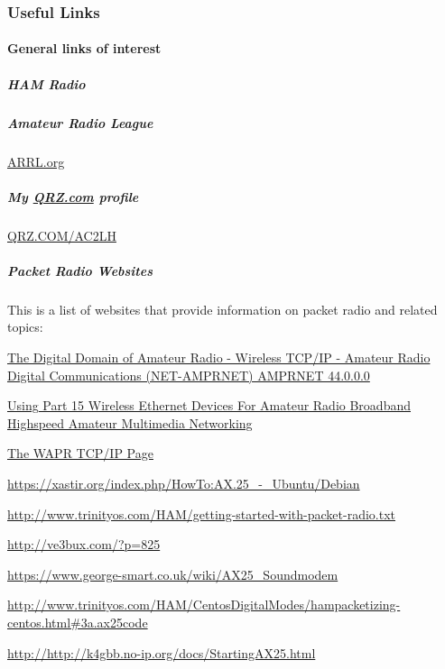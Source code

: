 \subsubsection{Useful Links}

\paragraph{General links of interest}

\subparagraph{HAM Radio}

\subparagraph{Amateur Radio League}

\href{http://www.arrl.org}{ARRL.org}

\subparagraph{My \href{http://QRZ.com}{QRZ.com} profile}

\href{http://www.qrz.com/db/AC2LH}{QRZ.COM/AC2LH}

\subparagraph{Packet Radio Websites}

This is a list of websites that provide information on packet radio and related topics:

\href{https://www.qsl.net/kb9mwr/wapr/tcpip/amprnet.html}{The Digital Domain of Amateur Radio - Wireless TCP/IP - Amateur Radio Digital Communications (NET-AMPRNET) AMPRNET 44.0.0.0}

\href{https://www.qsl.net/kb9mwr/projects/wireless/plan.html}{Using Part 15 Wireless Ethernet Devices For Amateur Radio Broadband Highspeed Amateur Multimedia Networking}

\href{https://www.qsl.net/kb9mwr/wapr/tcpip/}{The WAPR TCP/IP Page}

\href{https://xastir.org/index.php/HowTo:AX.25\_-\_Ubuntu/Debian}{https://xastir.org/index.php/HowTo:AX.25\_-\_Ubuntu/Debian}

\href{http://www.trinityos.com/HAM/getting-started-with-packet-radio.txt}{http://www.trinityos.com/HAM/getting-started-with-packet-radio.txt}

\href{http://ve3bux.com/?p=825}{http://ve3bux.com/?p=825}

\href{https://www.george-smart.co.uk/wiki/AX25\_Soundmodem}{https://www.george-smart.co.uk/wiki/AX25\_Soundmodem}

\href{http://www.trinityos.com/HAM/CentosDigitalModes/hampacketizing-centos.html\#3a.ax25code}{http://www.trinityos.com/HAM/CentosDigitalModes/hampacketizing-centos.html\#3a.ax25code}

\href{http://k4gbb.no-ip.org/docs/StartingAX25.html}{http://http://k4gbb.no-ip.org/docs/StartingAX25.html}

